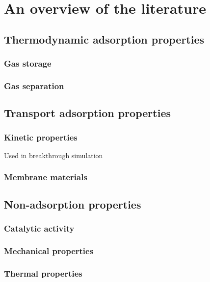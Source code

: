\documentclass[main.tex]{subfiles}
\begin{document}
\section{An overview of the literature}

\subsection{Thermodynamic adsorption properties}

\subsubsection{Gas storage}



\subsubsection{Gas separation}

\subsection{Transport adsorption properties}

\subsubsection{Kinetic properties}

Used in breakthrough simulation

\subsubsection{Membrane materials}

\subsection{Non-adsorption properties}

\subsubsection{Catalytic activity}

\subsubsection{Mechanical properties}

\subsubsection{Thermal properties}
\end{document}
